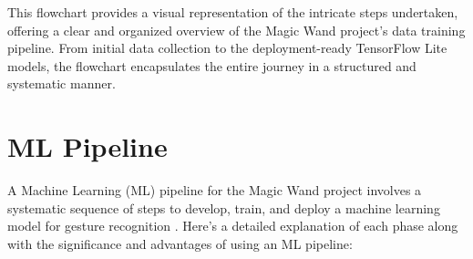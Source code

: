 This flowchart provides a visual representation of the intricate steps undertaken, offering a clear and organized overview of the Magic Wand project's data training pipeline. From initial data collection to the deployment-ready TensorFlow Lite models, the flowchart encapsulates the entire journey in a structured and systematic manner.

\section{ML Pipeline}

A Machine Learning (ML) pipeline for the Magic Wand project involves a systematic sequence of steps to develop, train, and deploy a machine learning model for gesture recognition \cite{Cong:2022}. Here's a detailed explanation of each phase along with the significance and advantages of using an ML pipeline:


